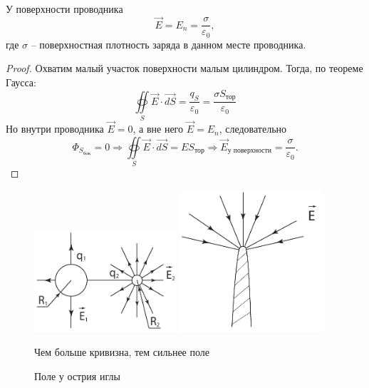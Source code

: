     \begin{proposition}
        У поверхности проводника
        \[
            \vec{E} = E_n = \frac{ \sigma }{ \varepsilon_0 },
        \]
        где \( \sigma \) -- поверхностная плотность заряда в данном месте 
        проводника.
    \end{proposition}

    \begin{proof}
        Охватим малый участок поверхности малым цилиндром. Тогда,
        по теореме Гаусса:
        \[
            \oiint\limits_S \vec{E}\cdot\vec{dS} = \frac{q_S}{\varepsilon_0} = 
            \frac{\sigma S_{\textit{тор}}}{\varepsilon_0}
        \]
        Но внутри проводника \( \vec{E} = 0 \), а вне него \( \vec{E} = E_n \), 
        следовательно
        \[
            \Phi_{S_{\textit{бок}}} = 0 \Rightarrow \oiint\limits_S \vec{E}
            \cdot \vec{dS} = ES_{\textit{тор}} \Rightarrow
            \vec{E}_{\textit{у поверхности}} = \frac{\sigma}{\varepsilon_0}.
        \]
    \end{proof}
    \begin{figure}[!b]
        \center
        \includegraphics[width=0.47\textwidth]{lec04/E_and_R.pdf}
        \hfill
        \includegraphics[width=0.47\textwidth]{lec04/needle.pdf}
        \parbox[t]{.47\textwidth}{
            \caption{Чем больше кривизна, тем сильнее поле}
            \label{4:E_and_R}
        }
        \hfill
        \parbox[t]{.47\textwidth}{
        \caption{Поле у острия иглы}
        \label{4:needle}
        }
    \end{figure}



